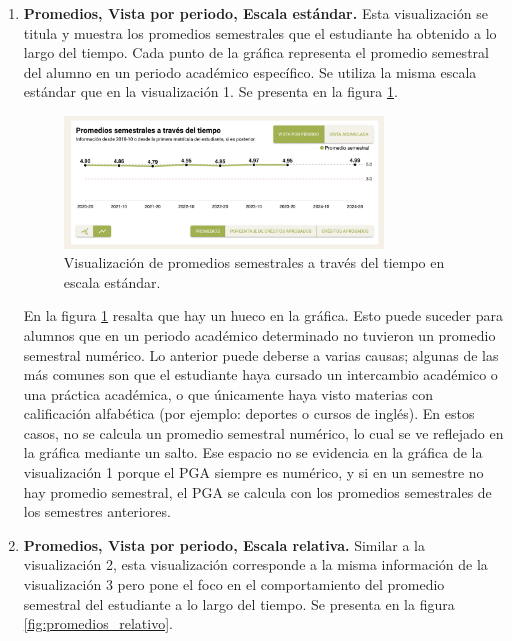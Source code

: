 \begin{enumerate}
  \item \textbf{Promedios, Vista por periodo, Escala estándar.} Esta visualización se titula  y muestra los promedios semestrales que el estudiante ha obtenido a lo largo del tiempo. Cada punto de la gráfica representa el promedio semestral del alumno en un periodo académico específico. Se utiliza la misma escala estándar que en la visualización 1. Se presenta en la figura \ref{fig:promedios_estandar}.
  
  \begin{figure}[H]
    \centering
    \includegraphics[width=0.8\textwidth]{img/nes/promedios_estandar.png}
    \caption{Visualización de promedios semestrales a través del tiempo en escala estándar.}
    \label{fig:promedios_estandar}
  \end{figure}

  En la figura \ref{fig:promedios_estandar} resalta que hay un hueco en la gráfica. Esto puede suceder para alumnos que en un periodo académico determinado no tuvieron un promedio semestral numérico. Lo anterior puede deberse a varias causas; algunas de las más comunes son que el estudiante haya cursado un intercambio académico o una práctica académica, o que únicamente haya visto materias con calificación alfabética (por ejemplo: deportes o cursos de inglés). En estos casos, no se calcula un promedio semestral numérico, lo cual se ve reflejado en la gráfica mediante un salto. Ese espacio no se evidencia en la gráfica de la visualización 1 porque el PGA siempre es numérico, y si en un semestre no hay promedio semestral, el PGA se calcula con los promedios semestrales de los semestres anteriores.

  \item \textbf{Promedios, Vista por periodo, Escala relativa.} Similar a la visualización 2, esta visualización corresponde a la misma información de la visualización 3 pero pone el foco en el comportamiento del promedio semestral del estudiante a lo largo del tiempo. Se presenta en la figura \ref{fig:promedios_relativo}.
  

\end{enumerate}
